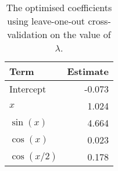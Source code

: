 \begin{table}[!h]

\caption{\label{tab:lasso-coefs}The optimised coefficients using leave-one-out cross-validation on the value of \(\lambda\).}
\centering
\begin{tabular}{lr}
\toprule
Term & Estimate\\
\midrule
Intercept & -0.073\\
\(x\) & 1.024\\
\(\sin(x)\) & 4.664\\
\(\cos(x)\) & 0.023\\
\(\cos(x/2)\) & 0.178\\
\bottomrule
\end{tabular}
\end{table}